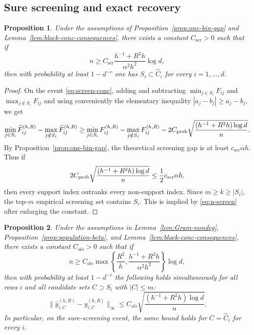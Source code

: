 \documentclass{article}
\newtheorem{proposition}{Proposition}[section]
\newcommand{\scr}{\mathrm{scr}}
\begin{document}
\subsection{Sure screening and exact recovery}
\label{appendix:5}

\begin{proposition}
\label{prop:sure-screening}
Under the assumptions of Proposition~\ref{prop:one-bin-gap} and Lemma~\ref{lem:block-conc-consequences}, there exists a constant $C_{\scr}>0$ such that if
\begin{equation}
\label{eq:n-screen}
n\ge C_{\scr}\frac{h^{-1}+R^2 h}{\alpha^2 h^2}\log d,
\end{equation}
then with probability at least $1-d^{-c}$ one has $S_i\subset \widehat C_i$ for every $i=1,\dots,d$.
\end{proposition}
\begin{proof}
On the event \eqref{eq:screen-conc}, adding and subtracting $\min_{j\in S_i}F_{ij}$ and $\max_{j\notin S_i}F_{ij}$ and using conveniently the elementary inequality $|a_j-b_j|\ge a_j-b_j$, we get
\[
\min_{j\in S_i}\widehat F_{ij}^{(h,R)} - \max_{j\notin S_i}\widehat F_{ij}^{(h,R)}
\ge
\min_{j\in S_i}F_{ij}^{(h,R)} - \max_{j\notin S_i}F_{ij}^{(h,R)} - 2C_{\rm prob}\sqrt{\frac{(h^{-1}+R^2 h)\log d}{n}}.
\]
By Proposition~\ref{prop:one-bin-gap}, the theoretical screening gap is at least $c_{\scr}\alpha h$. Thus if
\[
2C_{\rm prob}\sqrt{\frac{(h^{-1}+R^2 h)\log d}{n}}\le \frac12 c_{\scr}\alpha h,
\]
then every support index outranks every non-support index. Since $m\ge k\ge |S_i|$, the top-$m$ empirical screening set contains $S_i$. This is implied by \eqref{eq:n-screen} after enlarging the constant.
\end{proof}
\begin{proposition}
\label{prop:ols-error}
Under the assumptions in Lemma~\ref{lem:Gram-nondeg}, Proposition~\ref{prop:population-beta}, and Lemma~\ref{lem:block-conc-consequences}, there exists a constant $C_{ols}>0$ such that if
\begin{equation}
\label{eq:n-ols}
n\ge C_{ols}\max\!\left\{\frac{R^2}{h},\frac{h^{-1}+R^2 h}{\alpha^2 h^2}\right\}\log d,
\end{equation}
then with probability at least $1-d^{-c}$ the following holds simultaneously for all rows $i$ and all candidate sets $C\supset S_i$ with $|C|\le m$:
\begin{equation}
\label{eq:ols-inf-error}
\|\widehat y_{i,C}^{(h,R)}-y_{i,C}^{(h,R)}\|_\infty
\le C_{ols}\sqrt{\frac{(h^{-1}+R^2 h)\log d}{n}}.
\end{equation}
In particular, on the sure-screening event, the same bound holds for $C=\widehat C_i$ for every $i$.
\end{proposition}
\end{document}
